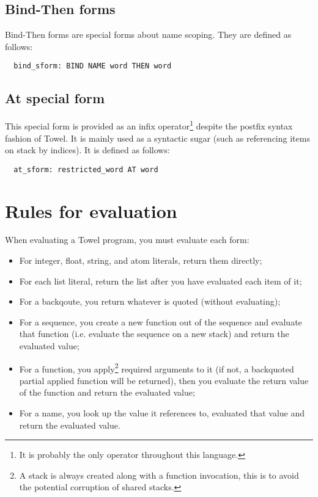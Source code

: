 \documentclass{article}
\begin{document}
\subsection{Bind-Then forms}

Bind-Then forms are special forms about name scoping. They are defined as follows:
\begin{verbatim}
  bind_sform: BIND NAME word THEN word
\end{verbatim}

\subsection{At special form}

This special form is provided as an infix operator\footnote{It is probably the only operator throughout this language.} despite the postfix syntax fashion of Towel. It is mainly used as a syntactic sugar (such as referencing items on stack by indices). It is defined as follows:
\begin{verbatim}
  at_sform: restricted_word AT word
\end{verbatim}

\section{Rules for evaluation}

When evaluating a Towel program, you must evaluate each form:
\begin{itemize}
\item For integer, float, string, and atom literals, return them directly;
\item For each list literal, return the list after you have evaluated each item of it;
\item For a backqoute, you return whatever is quoted (without evaluating);
\item For a sequence, you create a new function out of the sequence and evaluate that function (i.e. evaluate the sequence on a new stack) and return the evaluated value;
\item For a function, you apply\footnote{A stack is always created along with a function invocation, this is to avoid the potential corruption of shared stacks.} required arguments to it (if not, a backquoted partial applied function will be returned), then you evaluate the return value of the function and return the evaluated value;
\item For a name, you look up the value it references to, evaluated that value and return the evaluated value.
\end{itemize}
\end{document}
